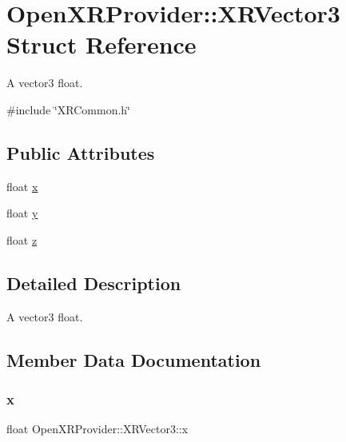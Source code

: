 \hypertarget{struct_open_x_r_provider_1_1_x_r_vector3}{}\section{Open\+X\+R\+Provider\+::X\+R\+Vector3 Struct Reference}
\label{struct_open_x_r_provider_1_1_x_r_vector3}


A vector3 float.  




{\ttfamily \#include \char`\"{}X\+R\+Common.\+h\char`\"{}}

\subsection*{Public Attributes}
\begin{DoxyCompactItemize}
\item 
float \mbox{\hyperlink{struct_open_x_r_provider_1_1_x_r_vector3_a18a9ed5cd0b6dab8465b0de7f4e28a6c}{x}}
\item 
float \mbox{\hyperlink{struct_open_x_r_provider_1_1_x_r_vector3_aa0ce76b27aed3728d6457ad923f2be9c}{y}}
\item 
float \mbox{\hyperlink{struct_open_x_r_provider_1_1_x_r_vector3_a079a1b8f13c5520e7e23f1cbeea57da2}{z}}
\end{DoxyCompactItemize}


\subsection{Detailed Description}
A vector3 float. 

\subsection{Member Data Documentation}
\mbox{\label{struct_open_x_r_provider_1_1_x_r_vector3_a18a9ed5cd0b6dab8465b0de7f4e28a6c}} 
\subsubsection{\texorpdfstring{x}{x}}
{\footnotesize\ttfamily float Open\+X\+R\+Provider\+::\+X\+R\+Vector3\+::x}

\mbox{\label{struct_open_x_r_provider_1_1_x_r_vector3_aa0ce76b27aed3728d6457ad923f2be9c}} 
